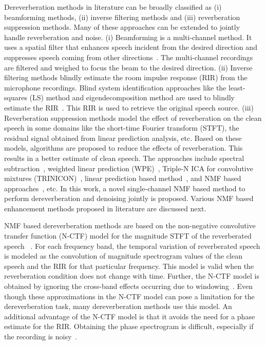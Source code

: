 Dereverberation methods in literature can be broadly classified as (i) beamforming methods, (ii) inverse filtering methods and (iii) reverberation suppression methods. Many of these approaches can be extended to jointly handle reverberation and noise. (i) Beamforming is a multi-channel method. It uses a spatial filter that enhances speech incident from the desired direction and suppresses speech coming from other directions~\cite{gannot2017consolidated}. The multi-channel recordings are filtered and weighed to focus the beam to the desired direction. (ii) Inverse filtering methods blindly estimate the room impulse response (RIR) from the microphone recordings. Blind system identification approaches like the least-squares (LS) method and eigendecomposition method are used to blindly estimate the RIR~\cite{naylor2010speech}. This RIR is used to retrieve the original speech source. (iii) Reverberation suppression methods model the effect of reverberation on the clean speech in some domains like the short-time Fourier transform (STFT), the residual signal obtained from linear prediction analysis, etc. Based on these models, algorithms are proposed to reduce the effects of reverberation. This results in a better estimate of clean speech. The approaches include spectral subtraction~\cite{lebart2001new}, weighted linear prediction (WPE)~\cite{nakatani2010speech}, Triple-N ICA for convolutive mixtures (TRINICON)~\cite{buchner2007trinicon}, linear prediction based method~\cite{naylor2010speech}, and NMF based approaches~\cite{kameoka2009robust}, etc. In this work, a novel single-channel NMF based method to perform dereverberation and denoising jointly is proposed. Various NMF based enhancement methods proposed in literature are discussed next. 

NMF based dereverberation methods are based on the non-negative convolutive transfer function (N-CTF) model for the magnitude STFT of the reverberated speech ~\cite{kameoka2009robust,mohammadiha2016speech, Mohammadiha2015, Kumar2011}. For each frequency band, the temporal variation of reverberated speech is modeled as the convolution of magnitude spectrogram values of the clean speech and the RIR for that particular frequency. This model is valid when the reverberation condition does not change with time. Further, the N-CTF model is obtained by ignoring the cross-band effects occurring due to windowing~\cite{avargel2007system}.  Even though these approximations in the N-CTF model can pose a limitation for the dereverberation task, many dereverberation methods use this model. An additional advantage of the N-CTF model is that it avoids the need for a phase estimate for the RIR. Obtaining the phase spectrogram is difficult, especially if the recording is noisy~\cite{kameoka2009robust}. 

